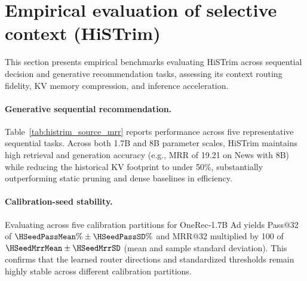 \section{Empirical evaluation of selective context (HiSTrim)}
\label{app:histrim_evidence}
This section presents empirical benchmarks evaluating HiSTrim across sequential
decision and generative recommendation tasks, assessing its context routing fidelity,
KV memory compression, and inference acceleration.



\paragraph{Generative sequential recommendation.}
Table~\ref{tab:histrim_source_mrr} reports performance across five representative
sequential tasks. Across both 1.7B and 8B parameter scales, HiSTrim maintains high
retrieval and generation accuracy (e.g., MRR of 19.21 on News with 8B) while reducing
the historical KV footprint to under 50\%, substantially outperforming static pruning
and dense baselines in efficiency.

\paragraph{Calibration-seed stability.}
Evaluating across five calibration partitions for OneRec-1.7B Ad yields Pass@32 of
$\HSeedPassMean\%\pm\HSeedPassSD\%$ and MRR@32 multiplied by 100 of
$\HSeedMrrMean\pm\HSeedMrrSD$ (mean and sample standard deviation). This confirms that
the learned router directions and standardized thresholds remain highly stable across
different calibration partitions.

